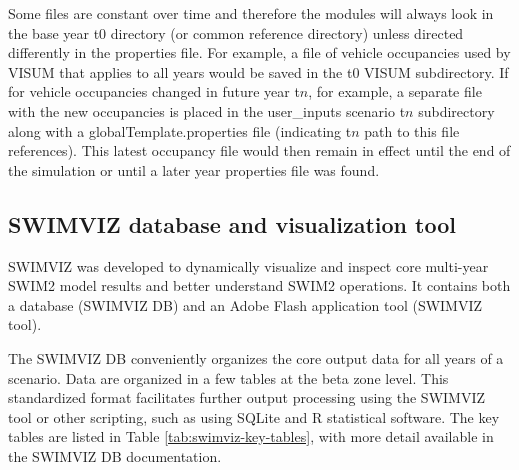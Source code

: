 Some files are constant over time and therefore the modules will always look in the base year t0 directory (or common reference directory) unless directed differently in the properties file. For example, a file of vehicle occupancies used by VISUM that applies to all years would be saved in the t0 VISUM subdirectory. If for vehicle occupancies changed in future year t$n$, for example, a separate file with the new occupancies is placed in the user\_inputs scenario t$n$ subdirectory along with a globalTemplate.properties file (indicating t$n$ path to this file references). This latest occupancy file would then remain in effect until the end of the simulation or until a later year properties file was found. 

\subsection{SWIMVIZ database and visualization tool}
SWIMVIZ was developed to dynamically visualize and inspect core multi-year SWIM2 model results and better understand SWIM2 operations. It contains both a database (SWIMVIZ DB) and an Adobe Flash application tool (SWIMVIZ tool). 

The SWIMVIZ DB conveniently organizes the core output data for all years of a scenario. Data are organized in a few tables at the beta zone level. This standardized format facilitates further output processing using the SWIMVIZ tool or other scripting, such as using SQLite and R statistical software. The key tables are listed in Table \ref{tab:swimviz-key-tables}, with more detail available in the SWIMVIZ DB documentation.

